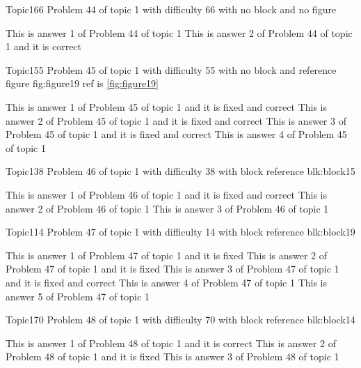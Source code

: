 \documentclass[master]{exam}
\begin{document}
\begin{problem}{Topic1}{66}
	Problem 44 of topic 1 with difficulty 66 with no block and no figure
	\begin{answers}
		\answer This is answer 1 of Problem 44 of topic 1 
		\answer[correct] This is answer 2 of Problem 44 of topic 1 and it is correct
	\end{answers}
\end{problem}

\begin{problem}{Topic1}{55}
	Problem 45 of topic 1 with difficulty 55 with no block and reference figure fig:figure19 ref is \ref{fig:figure19}
	\begin{answers}
		 This is answer 1 of Problem 45 of topic 1 and it is fixed and correct
		 This is answer 2 of Problem 45 of topic 1 and it is fixed and correct
		 This is answer 3 of Problem 45 of topic 1 and it is fixed and correct
		\answer This is answer 4 of Problem 45 of topic 1 
	\end{answers}
\end{problem}

\begin{problem}[requires=blk:block15]{Topic1}{38}
	Problem 46 of topic 1 with difficulty 38 with block reference blk:block15
	\begin{answers}
		 This is answer 1 of Problem 46 of topic 1 and it is fixed and correct
		\answer This is answer 2 of Problem 46 of topic 1 
		\answer This is answer 3 of Problem 46 of topic 1 
	\end{answers}
\end{problem}

\begin{problem}[requires=blk:block19]{Topic1}{14}
	Problem 47 of topic 1 with difficulty 14 with block reference blk:block19
	\begin{answers}
		\answer[fixed] This is answer 1 of Problem 47 of topic 1 and it is fixed
		\answer[fixed] This is answer 2 of Problem 47 of topic 1 and it is fixed
		 This is answer 3 of Problem 47 of topic 1 and it is fixed and correct
		\answer This is answer 4 of Problem 47 of topic 1 
		\answer This is answer 5 of Problem 47 of topic 1 
	\end{answers}
\end{problem}

\begin{problem}[requires=blk:block14]{Topic1}{70}
	Problem 48 of topic 1 with difficulty 70 with block reference blk:block14
	\begin{answers}
		\answer[correct] This is answer 1 of Problem 48 of topic 1 and it is correct
		\answer[fixed] This is answer 2 of Problem 48 of topic 1 and it is fixed
		\answer This is answer 3 of Problem 48 of topic 1 
	\end{answers}
\end{problem}
\end{document}

